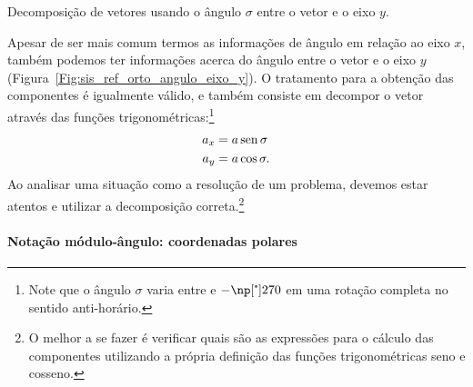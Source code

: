 \begin{marginfigure}[2cm]
\centering
{}
\caption{Decomposição de vetores usando o ângulo $\sigma$ entre o vetor e o eixo $y$.\label{Fig:sis_ref_orto_angulo_eixo_y}}
\end{marginfigure}

Apesar de ser mais comum termos as informações de ângulo em relação ao eixo $x$, também podemos ter informações acerca do ângulo entre o vetor e o eixo $y$ (Figura~\ref{Fig:sis_ref_orto_angulo_eixo_y}). O tratamento para a obtenção das componentes é igualmente válido, e também consiste em decompor o vetor através das funções trigonométricas:\footnote[][2cm]{Note que o ângulo $\sigma$ varia entre  e $-\degree{270}$ em uma rotação completa no sentido anti-horário.}
\begin{align}
    a_x &= a\operatorname{sen}\sigma \\
    a_y &= a\cos\sigma.
\end{align}
%
Ao analisar uma situação como a resolução de um problema, devemos estar atentos e utilizar a decomposição correta.\footnote{O melhor a se fazer é verificar quais são as expressões para o cálculo das componentes utilizando a própria definição das funções trigonométricas seno e cosseno.}

\paragraph{Notação módulo-ângulo: coordenadas polares}

